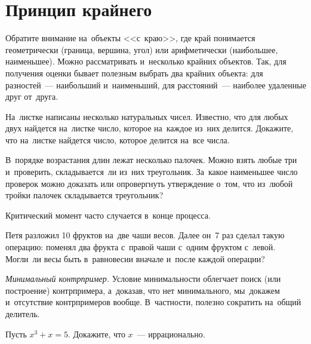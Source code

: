 
\section*{Принцип крайнего}



Обратите внимание на~объекты <<с~краю>>, где край понимается геометрически
(граница, вершина, угол) или арифметически (наибольшее, наименьшее).
Можно рассматривать и~несколько крайних объектов.
Так, для получения оценки бывает полезным выбрать два крайних объекта: для
разностей~--- наибольший и~наименьший, для расстояний~--- наиболее удаленные
друг от~друга.

\begin{problems}

\item
На~листке написаны несколько натуральных чисел.
Известно, что для любых двух найдется на~листке число, которое на~каждое из~них
делится.
Докажите, что на~листке найдется число, которое делится на~все числа.

\item
В~порядке возрастания длин лежат несколько палочек.
Можно взять любые три и~проверить, складывается~ли из~них треугольник.
За~какое наименьшее число проверок можно доказать или опровергнуть утверждение
о~том, что из~любой тройки палочек складывается треугольник?

\end{problems}

Критический момент часто случается в~конце процесса.

\begin{problems}

\item
Петя разложил 10 фруктов на~две чаши весов.
Далее он~7 раз сделал такую операцию: поменял два фрукта с~правой чаши с~одним
фруктом с~левой.
Могли~ли весы быть в~равновесии вначале и~после каждой операции?

\end{problems}

\emph{Минимальный контрпример.}
Условие минимальности облегчает поиск (или построение) контрпримера, а~доказав,
что нет минимального, мы~докажем и~отсутствие контрпримеров вообще.
В~частности, полезно сократить на~общий делитель.

\begin{problems}

\item
Пусть $x^3 + x = 5$.
Докажите, что $x$~--- иррационально.

\end{problems}

